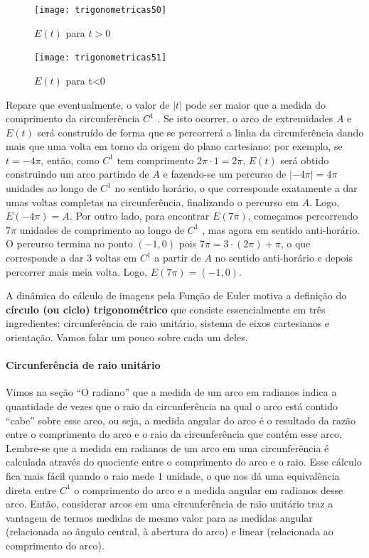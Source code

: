\begin{minipage}{.45\linewidth}
\begin{figure}[H]
\centering

\texttt{[image: trigonometricas50]}
\caption{$E(t)$ para $t>0$}
\label{}
\end{figure}
\end{minipage}
\begin{minipage}{.45\linewidth}
\begin{figure}[H]
\centering

\texttt{[image: trigonometricas51]}
\caption{$E(t) \text{ para } $t<0}
\label{}
\end{figure}
\end{minipage}

Repare que eventualmente, o valor de $|t|$ pode ser maior que a medida do comprimento da circunferência $C^1$ . Se isto ocorrer, o arco de extremidades $A$ e $E(t)$ será construído de forma que se percorrerá a linha da circunferência dando mais que uma volta em torno da origem do plano cartesiano: por exemplo, se $t=-4\pi$, então, como $C^1$ tem comprimento $2\pi\cdot1=2\pi$, $E(t)$ será obtido construindo um arco partindo de $A$ e fazendo-se um percurso de $|-4\pi |=4\pi$ unidades ao longo de $C^1$ no sentido horário, o que corresponde exatamente a dar umas voltas completas na circunferência, finalizando o percurso em $A$. Logo, $E(-4\pi)=A$. Por outro lado, para encontrar $E(7\pi)$, começamos percorrendo $7\pi$ unidades de comprimento ao longo de $C^1$ , mas agora em sentido anti-horário. O percurso termina no ponto $(-1,0)$ pois $7\pi=3\cdot(2\pi)+\pi$, o que corresponde a dar $3$ voltas em $C^1$ a partir de $A$ no sentido anti-horário e depois percorrer mais meia volta. Logo, $E(7\pi) = (-1,0)$.

A dinâmica do cálculo de imagens pela Função de Euler motiva a definição do \textbf{círculo (ou ciclo) trigonométrico} que consiste essencialmente em três ingredientes: circunferência de raio unitário, sistema de eixos cartesianos e orientação. Vamos falar um pouco sobre cada um deles.

\paragraph{Circunferência de raio unitário}

Vimos na seção “O radiano”{} que a medida de um arco em radianos indica a quantidade de vezes que o raio da circunferência na qual o arco está contido “cabe”{} sobre esse arco, ou seja, a medida angular do arco é o resultado da razão entre o comprimento do arco e o raio da circunferência que contém esse arco. Lembre-se que a medida em radianos de um arco em uma circunferência é calculada através do quociente entre o comprimento do arco e o raio. Esse cálculo fica mais fácil quando o raio mede $1$ unidade, o que nos dá uma equivalência direta entre $C^1$ o comprimento do arco e a medida angular em radianos desse arco. Então, considerar arcos em uma circunferência de raio unitário traz a vantagem de termos medidas de mesmo valor para as medidas angular (relacionada ao ângulo central, à abertura do arco) e linear (relacionada ao comprimento do arco).

